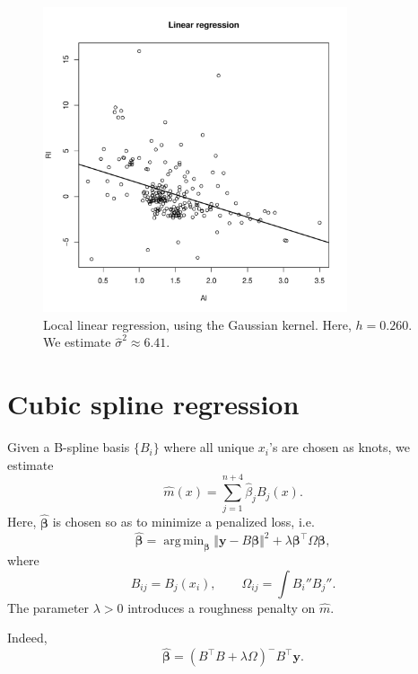 \documentclass[10pt]{article}
\DeclareMathOperator*{\argmin}{arg\,min}
\begin{document}
    \begin{figure}[H]
    \begin{center}
        \includegraphics[page = 5, width = 0.8\textwidth]{glass.pdf}
    \end{center}
    \caption{
        Local linear regression, using the Gaussian kernel. Here, $h = 0.260$.
        We estimate $\widehat{\sigma}^2 \approx 6.41$.
    }
    \label{fig:glass_local_linear}
    \end{figure}



    \section{Cubic spline regression}

    Given a B-spline basis $\{B_i\}$ where all unique $x_i$'s are chosen as
    knots, we estimate \[
        \widehat{m}(x) = \sum_{j = 1}^{n + 4} \widehat{\beta}_j B_j(x).
    \] Here, $\widehat{\bm{\beta}}$ is chosen so as to minimize a penalized loss,
    i.e.\ \[
        \widehat{\bm{\beta}} = \argmin_{\bm{\beta}} \Vert \bm{y} -
        B\bm{\beta}\Vert^2 + \lambda\bm{\beta}^\top\Omega\bm{\beta},
    \] where \[
        B_{ij} = B_j(x_i), \qquad
        \Omega_{ij} = \int B_i'' B_j''.
    \] The parameter $\lambda > 0$ introduces a roughness penalty on
    $\widehat{m}$.

    Indeed, \[
        \widehat{\bm{\beta}} = (B^\top B + \lambda\Omega)^- B^\top \bm{y}.
    \]
\end{document}
